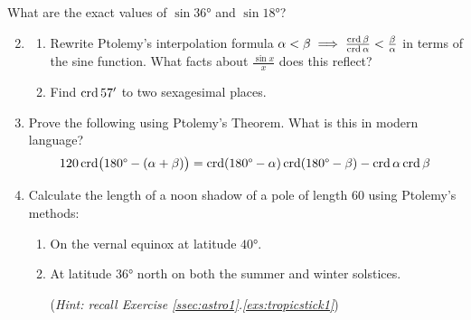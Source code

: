 



\begin{exercises}{}{}
\exstart What are the exact values of $\sin\ang{36}$ and $\sin\ang{18}$?

\begin{enumerate}\setcounter{enumi}{1}
  \item\begin{enumerate}
    \item Rewrite Ptolemy's interpolation formula $\alpha<\beta\implies \frac{\crd\beta}{\crd\alpha}<\frac\beta\alpha$ in terms of the sine function. What facts about $\frac{\sin x}x$ does this reflect?
    \item Find $\crd 57'$ to two sexagesimal places.
  \end{enumerate} 
  
  \item%
  Prove the following using Ptolemy's Theorem. What is this in modern language?
  \[120\crd\bigl(\ang{180}-(\alpha+\beta)\bigr) =\crd(\ang{180}-\alpha)\crd(\ang{180}-\beta)-\crd\alpha\crd\beta\]
  
  
  \item%
  Calculate the length of a noon shadow of a pole of length 60 using Ptolemy's methods:
  \begin{enumerate}
    \item On the vernal equinox at latitude $\ang{40}$.
  	\item%
  	At latitude \ang{36} north on both the summer and winter solstices.\par
  (\emph{Hint: recall Exercise \ref*{ssec:astro1}.\ref{exs:tropicstick1}})
  \end{enumerate}
\end{enumerate}
\end{exercises}
\clearpage